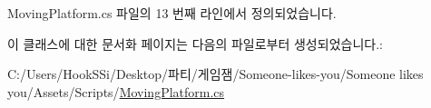 Moving\+Platform.\+cs 파일의 13 번째 라인에서 정의되었습니다.



이 클래스에 대한 문서화 페이지는 다음의 파일로부터 생성되었습니다.\+:\begin{DoxyCompactItemize}
\item 
C\+:/\+Users/\+Hook\+S\+Si/\+Desktop/파티/게임잼/\+Someone-\/likes-\/you/\+Someone likes you/\+Assets/\+Scripts/\mbox{\hyperlink{_moving_platform_8cs}{Moving\+Platform.\+cs}}\end{DoxyCompactItemize}
